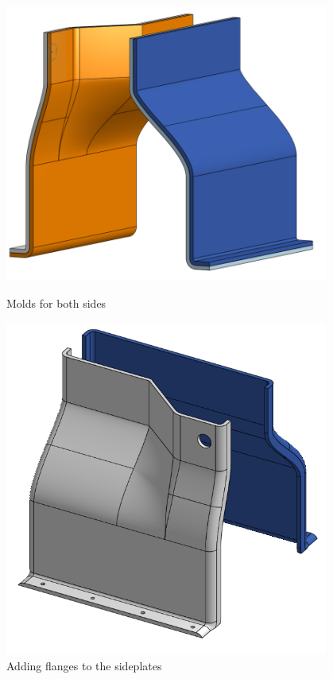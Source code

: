  

\begin{figure}[ht]
\centering
\begin{minipage}[b]{.48\textwidth}
  \centering
  \includegraphics[width=0.95\textwidth]{Meetings/November/11-27-21/11-22-21_CAD_Figure1 - Nathan Forrer.PNG}
  \caption{Molds for both sides}
  \label{fig:pic1}
\end{minipage}%
\hfill%
\begin{minipage}[b]{.48\textwidth}
  \centering
  \includegraphics[width=0.95\textwidth]{Meetings/November/11-27-21/11-22-21_CAD_Figure2 - Nathan Forrer.PNG}
  \caption{Adding flanges to the sideplates}
  \label{fig:pic2}
\end{minipage}
\end{figure}

